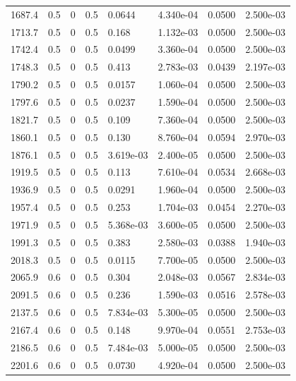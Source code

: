 \documentclass[preview]{standalone}
\begin{document}
{{{\begin{tabular}{L{1.2cm}C{1.2cm} C{0.3cm}C{0.5cm} C{1.4cm}C{1.4cm} C{1.4cm}C{1.4cm}}
  1687.4  &   0.5  & 0     & 0.5 &  0.0644  & 4.340e-04  & 0.0500 &  2.500e-03   \\ 
  1713.7  &   0.5  & 0     & 0.5 &  0.168  & 1.132e-03  & 0.0500 &  2.500e-03   \\ 
  1742.4  &   0.5  & 0     & 0.5 &  0.0499  & 3.360e-04  & 0.0500 &  2.500e-03   \\ 
  1748.3  &   0.5  & 0     & 0.5 &  0.413  & 2.783e-03  & 0.0439 &  2.197e-03   \\ 
  1790.2  &   0.5  & 0     & 0.5 &  0.0157  & 1.060e-04  & 0.0500 &  2.500e-03   \\ 
  1797.6  &   0.5  & 0     & 0.5 &  0.0237  & 1.590e-04  & 0.0500 &  2.500e-03   \\ 
  1821.7  &   0.5  & 0     & 0.5 &  0.109  & 7.360e-04  & 0.0500 &  2.500e-03   \\ 
  1860.1  &   0.5  & 0     & 0.5 &  0.130  & 8.760e-04  & 0.0594 &  2.970e-03   \\ 
  1876.1  &   0.5  & 0     & 0.5 &  3.619e-03  & 2.400e-05  & 0.0500 &  2.500e-03   \\ 
  1919.5  &   0.5  & 0     & 0.5 &  0.113  & 7.610e-04  & 0.0534 &  2.668e-03   \\ 
  1936.9  &   0.5  & 0     & 0.5 &  0.0291  & 1.960e-04  & 0.0500 &  2.500e-03   \\ 
  1957.4  &   0.5  & 0     & 0.5 &  0.253  & 1.704e-03  & 0.0454 &  2.270e-03   \\ 
  1971.9  &   0.5  & 0     & 0.5 &  5.368e-03  & 3.600e-05  & 0.0500 &  2.500e-03   \\ 
  1991.3  &   0.5  & 0     & 0.5 &  0.383  & 2.580e-03  & 0.0388 &  1.940e-03   \\ 
  2018.3  &   0.5  & 0     & 0.5 &  0.0115  & 7.700e-05  & 0.0500 &  2.500e-03   \\ 
  2065.9  &   0.6  & 0     & 0.5 &  0.304  & 2.048e-03  & 0.0567 &  2.834e-03   \\ 
  2091.5  &   0.6  & 0     & 0.5 &  0.236  & 1.590e-03  & 0.0516 &  2.578e-03   \\ 
  2137.5  &   0.6  & 0     & 0.5 &  7.834e-03  & 5.300e-05  & 0.0500 &  2.500e-03   \\ 
  2167.4  &   0.6  & 0     & 0.5 &  0.148  & 9.970e-04  & 0.0551 &  2.753e-03   \\ 
  2186.5  &   0.6  & 0     & 0.5 &  7.484e-03  & 5.000e-05  & 0.0500 &  2.500e-03   \\ 
  2201.6  &   0.6  & 0     & 0.5 &  0.0730  & 4.920e-04  & 0.0500 &  2.500e-03   \\ 

\end{tabular}}}}
\end{document}
